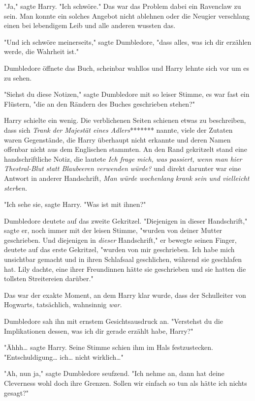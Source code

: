 {"Ja," sagte Harry. "Ich schwöre." Das war das Problem dabei ein Ravenclaw zu sein. Man konnte ein solches Angebot nicht ablehnen oder die Neugier verschlang einen bei lebendigem Leib und alle anderen wussten das.

"Und ich schwöre meinerseits," sagte Dumbledore, "dass alles, was ich dir erzählen werde, die Wahrheit ist."

Dumbledore öffnete das Buch, scheinbar wahllos und Harry lehnte sich vor um es zu sehen.

"Siehst du diese Notizen," sagte Dumbledore mit so leiser Stimme, es war fast ein Flüstern, "die an den Rändern des Buches geschrieben stehen?"

Harry schielte ein wenig. Die verblichenen Seiten schienen etwas zu beschreiben, dass sich \emph{Trank der Majestät eines Adlers}******* nannte, viele der Zutaten waren Gegenstände, die Harry überhaupt nicht erkannte und deren Namen offenbar nicht aus dem Englischen stammten. An den Rand gekritzelt stand eine handschriftliche Notiz, die lautete \emph{Ich frage mich, was passiert, wenn man hier Thestral-Blut statt Blaubeeren verwenden würde?} und direkt darunter war eine Antwort in anderer Handschrift, \emph{Man würde wochenlang krank sein und vielleicht sterben.}

"Ich sehe sie, sagte Harry. "Was ist mit ihnen?"

Dumbledore deutete auf das zweite Gekritzel. "Diejenigen in dieser Handschrift," sagte er, noch immer mit der leisen Stimme, "wurden von deiner Mutter geschrieben. Und diejenigen in \emph{dieser} Handschrift," er bewegte seinen Finger, deutete auf das erste Gekritzel, "wurden von mir geschrieben. Ich habe mich unsichtbar gemacht und in ihren Schlafsaal geschlichen, während sie geschlafen hat. Lily dachte, eine ihrer Freundinnen hätte sie geschrieben und sie hatten die tollsten Streitereien darüber."

Das war der exakte Moment, an dem Harry klar wurde, dass der Schulleiter von Hogwarts, tatsächlich, wahnsinnig \emph{war.}

Dumbledore sah ihn mit ernstem Gesichtsausdruck an. "Verstehst du die Implikationen dessen, was ich dir gerade erzählt habe, Harry?"

"Ähhh… sagte Harry. Seine Stimme schien ihm im Hals festzustecken. "Entschuldigung… ich… nicht wirklich…"

"Ah, nun ja," sagte Dumbledore seufzend. "Ich nehme an, dann hat deine Cleverness wohl doch ihre Grenzen. Sollen wir einfach so tun als hätte ich nichts gesagt?"

}
